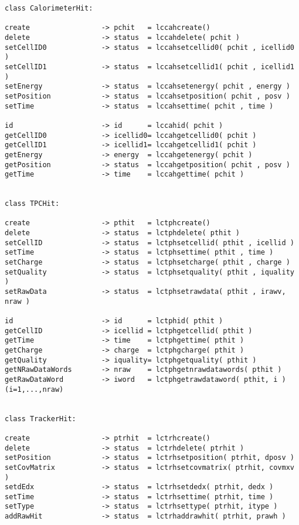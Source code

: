 \begin{scriptsize}
\begin{verbatim}
class CalorimeterHit:

create                 -> pchit   = lccahcreate()
delete                 -> status  = lccahdelete( pchit )
setCellID0             -> status  = lccahsetcellid0( pchit , icellid0 )
setCellID1             -> status  = lccahsetcellid1( pchit , icellid1 )
setEnergy              -> status  = lccahsetenergy( pchit , energy )
setPosition            -> status  = lccahsetposition( pchit , posv )
setTime                -> status  = lccahsettime( pchit , time )

id                     -> id      = lccahid( pchit )
getCellID0             -> icellid0= lccahgetcellid0( pchit )
getCellID1             -> icellid1= lccahgetcellid1( pchit )
getEnergy              -> energy  = lccahgetenergy( pchit )
getPosition            -> status  = lccahgetposition( pchit , posv )
getTime                -> time    = lccahgettime( pchit )


class TPCHit:

create                 -> pthit   = lctphcreate()
delete                 -> status  = lctphdelete( pthit )
setCellID              -> status  = lctphsetcellid( pthit , icellid )
setTime                -> status  = lctphsettime( pthit , time )
setCharge              -> status  = lctphsetcharge( pthit , charge )
setQuality             -> status  = lctphsetquality( pthit , iquality )
setRawData             -> status  = lctphsetrawdata( pthit , irawv, nraw )

id                     -> id      = lctphid( pthit )
getCellID              -> icellid = lctphgetcellid( pthit )
getTime                -> time    = lctphgettime( pthit )
getCharge              -> charge  = lctphgcharge( pthit )
getQuality             -> iquality= lctphgetquality( pthit )
getNRawDataWords       -> nraw    = lctphgetnrawdatawords( pthit )
getRawDataWord         -> iword   = lctphgetrawdataword( pthit, i )  (i=1,...,nraw)


class TrackerHit:

create                 -> ptrhit  = lctrhcreate()
delete                 -> status  = lctrhdelete( ptrhit )
setPosition            -> status  = lctrhsetposition( ptrhit, dposv )
setCovMatrix           -> status  = lctrhsetcovmatrix( ptrhit, covmxv )
setdEdx                -> status  = lctrhsetdedx( ptrhit, dedx )
setTime                -> status  = lctrhsettime( ptrhit, time )
setType                -> status  = lctrhsettype( ptrhit, itype )
addRawHit              -> status  = lctrhaddrawhit( ptrhit, prawh )


\end{verbatim}
\end{scriptsize}
